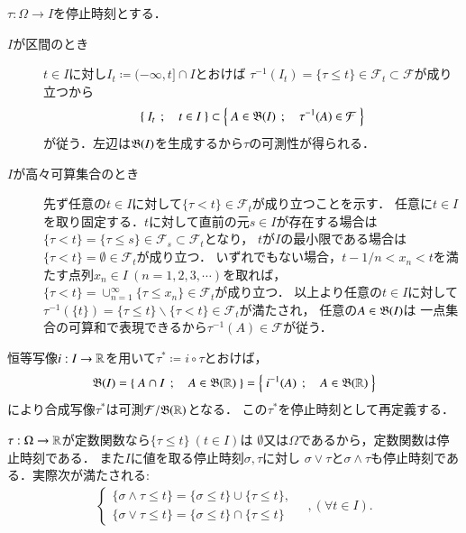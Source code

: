 	\begin{prf} $\tau:\Omega \rightarrow I$を停止時刻とする．
		\begin{description}
			\item[$I$が区間のとき]
				$t \in I$に対し$I_t \coloneqq (-\infty,t] \cap I$とおけば
				$\tau^{-1}(I_t) = \{ \tau \leq t \} \in \mathcal{F}_t \subset \mathcal{F}$が成り立つから
				\begin{align}
					\left\{\ I_t\ \, ; \quad t \in I\ \right\} \subset \left\{\ A \in \mathfrak{B}(I)\ \, ; \quad \tau^{-1}(A) \in \mathcal{F}\ \right\}
					\label{eq:stopping_time_mble}
				\end{align}
				が従う．左辺は$\mathfrak{B}(I)$を生成するから$\tau$の可測性が得られる．
				
			\item[$I$が高々可算集合のとき]
				先ず任意の$t \in I$に対して$\{ \tau < t \} \in \mathcal{F}_t$が成り立つことを示す．
				任意に$t \in I$を取り固定する．$t$に対して直前の元$s \in I$が存在する場合は
				$\{ \tau < t \} = \{ \tau \leq s \} \in \mathcal{F}_s \subset \mathcal{F}_t$となり，
				$t$が$I$の最小限である場合は$\{ \tau < t \} = \emptyset \in \mathcal{F}_t$が成り立つ．
				いずれでもない場合，$t - 1/n < x_n < t$を満たす点列$x_n \in I\ (n=1,2,3,\cdots)$を取れば，
				$\{ \tau < t \} = \cup_{n=1}^{\infty}\{ \tau \leq x_n \} \in \mathcal{F}_t$が成り立つ．
				以上より任意の$t \in I$に対して$\tau^{-1}(\{t\}) = \{ \tau \leq t \} \backslash \{ \tau < t \} \in \mathcal{F}_t$が満たされ，
				任意の$A \in \mathfrak{B}(I)$は
				一点集合の可算和で表現できるから$\tau^{-1}(A) \in \mathcal{F}$が従う．
				\QED
		\end{description}
	\end{prf}
	
	\begin{screen}
		\begin{dfn}[停止時刻の再定義]
			恒等写像$i:I \rightarrow \mathbb{R}$を用いて$\tau^* \coloneqq i \circ \tau$とおけば，
			\begin{align}
				\mathfrak{B}(I)=\left\{\ A \cap I\ \, ; \quad A \in \mathfrak{B}(\mathbb{R})\ \right\} = \left\{\ i^{-1}(A)\ \, ; \quad A \in \mathfrak{B}(\mathbb{R})\ \right\}
			\end{align}
			により合成写像$\tau^*$は可測$\mathcal{F}/\mathfrak{B}(\mathbb{R})$となる．
			この$\tau^*$を停止時刻として再定義する．
		\end{dfn}
	\end{screen}
	
	$\tau:\Omega \rightarrow \mathbb{R}$が定数関数なら$\{\tau \leq t\}\ (t \in I)$は
	$\emptyset$又は$\Omega$であるから，定数関数は停止時刻である．
	また$I$に値を取る停止時刻$\sigma,\tau$に対し
	$\sigma \vee \tau$と$\sigma \wedge \tau$も停止時刻である．実際次が満たされる:
	\begin{align}
		\begin{cases}
			\{ \sigma \wedge \tau \leq t \} = \{ \sigma \leq t \} \cup \{ \tau \leq t \}, \\
			\{ \sigma \vee \tau \leq t \} = \{ \sigma \leq t \} \cap \{ \tau \leq t \}
		\end{cases}
		\quad ,(\forall t \in I).
	\end{align}
	
